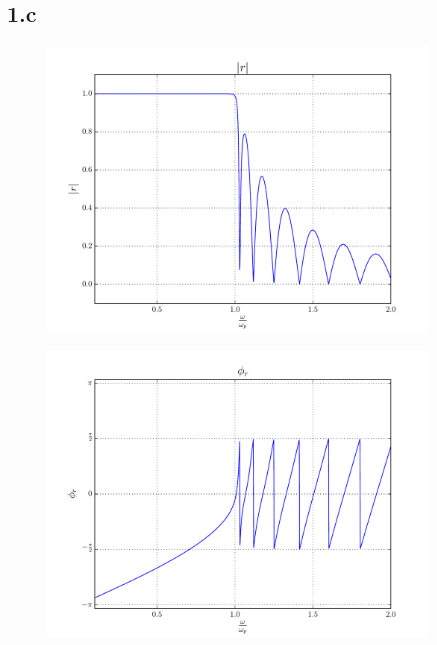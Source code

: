 \documentclass[a4paper,11pt]{article}
\begin{document}
\subsection*{1.c}  
                            \begin{figure}[!ht]
                            \centering \includegraphics[width=0.9\textwidth]{Punto1BC/r_N.pdf}
                            \end{figure}
                            \begin{figure}[!ht]
                            \centering \includegraphics[width=0.9\textwidth]{Punto1BC/r_f.pdf}
                            \end{figure}
\end{document}
